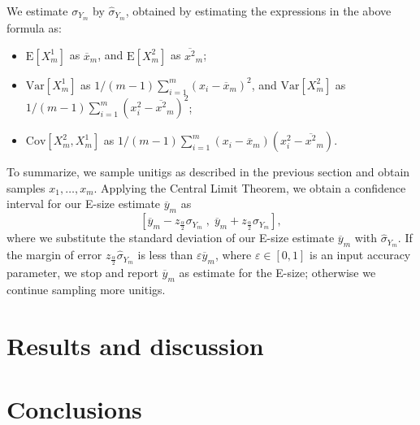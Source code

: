 \documentclass[a4paper,11pt]{article}
\newcommand{\Var}{\text{Var}}
\newcommand{\Cov}{\text{Cov}}
\newcommand{\E}{\text{E}}
\begin{document}
We estimate $\sigma_{Y_m}$ by $\hat{\sigma}_{Y_m}$, obtained by estimating the expressions in the above formula as:
\begin{itemize}
\item $\E[X^1_m]$ as $\overline{x}_m$, and $\E[X^2_m]$ as $\overline{x^2}_m$;
\item $\Var[X^1_m]$ as $1/(m-1) \sum_{i = 1}^{m} (x_i - \overline{x}_m)^2$, and $\Var[X^2_m]$ as $1/(m-1) \sum_{i = 1}^{m} (x_i^2 - \overline{x^2}_m)^2$;
\item $\Cov[X^2_m,X^1_m]$ as $1/(m-1) \sum_{i=1}^{m} (x_i - \overline{x}_m)(x_i^2 - \overline{x^2}_m)$. 

\end{itemize}

To summarize, we sample unitigs as described in the previous section and obtain samples $x_1,\dots, x_m$. Applying the Central Limit Theorem, we obtain a confidence interval for our E-size estimate $\overline{y}_m$ as 
\[\left[\overline{y}_m - z_{\frac{\alpha}{2}}\sigma_{Y_m} \;,\; \overline{y}_m + z_{\frac{\alpha}{2}}\sigma_{Y_m}\right], \]
where we substitute the standard deviation of our E-size estimate $\overline{y}_m$ with $\hat{\sigma}_{Y_m}$. If the margin of error $z_{\frac{\alpha}{2}}\hat{\sigma}_{Y_m}$ is less than $\varepsilon \overline{y}_m$, where $\varepsilon \in [0,1]$ is an input accuracy parameter, we stop and report $\overline{y}_m$ as estimate for the E-size; otherwise we continue sampling more unitigs.

\section{Results and discussion} %
\label{sec:results_and_discussion}


\section{Conclusions} %
\label{sec:conclusions}




\end{document}
